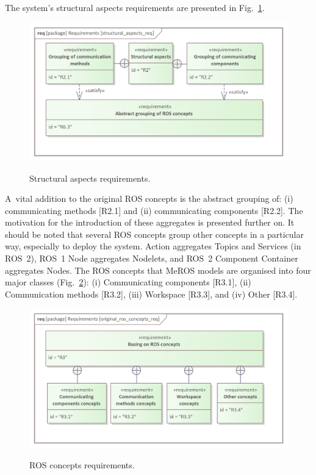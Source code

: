 \documentclass[11pt,oneside,a4paper]{article}
\begin{document}
	\pagebreak
	
	The system's structural aspects requirements are presented in Fig.~\ref{fig:structural_aspects_req}.
	
	\begin{figure}[H]
		\centering
		\begin{center}
			{\includegraphics[scale=1.0]{img/requirement_pkg/structural_aspects_req.png}}
		\end{center}
		\caption{Structural aspects requirements.} 
		\label{fig:structural_aspects_req}
	\end{figure}
	
	A~vital addition to the original ROS concepts is the abstract grouping of: (i) communicating methods [R2.1] and (ii) communicating components [R2.2]. The motivation for the introduction of these aggregates is presented further on. It should be noted that several ROS concepts group other concepts in a particular way, especially to deploy the system. Action aggregates Topics and Services (in ROS~2), ROS~1 Node aggregates Nodelets, and ROS~2 Component Container aggregates Nodes.
	The ROS concepts that MeROS models are organised into four major classes (Fig.~\ref{fig:ros_concepts_req}): (i) Communicating components [R3.1], (ii) Communication methods [R3.2], (iii) Workspace [R3.3], and (iv) Other [R3.4].
	
	\begin{figure}[H]
		\centering
		\begin{center}
			{\includegraphics[scale=1.0]{img/requirement_pkg/original_ros_concepts_req.png}}
		\end{center}
		\caption{ROS concepts requirements.} 
		\label{fig:ros_concepts_req}
	\end{figure}
	
\end{document}
